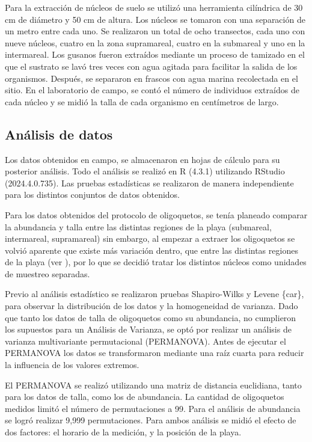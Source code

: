 \documentclass[
  authoryear,
  preprint,
  3p,
  twocolumn]{elsarticle}
\begin{document}
Para la extracción de núcleos de suelo se utilizó una herramienta
cilíndrica de 30 cm de diámetro y 50 cm de altura. Los núcleos se
tomaron con una separación de un metro entre cada uno. Se realizaron un
total de ocho transectos, cada uno con nueve núcleos, cuatro en la zona
supramareal, cuatro en la submareal y uno en la intermareal. Los gusanos
fueron extraídos mediante un proceso de tamizado en el que el sustrato
se lavó tres veces con agua agitada para facilitar la salida de los
organismos. Después, se separaron en frascos con agua marina recolectada
en el sitio. En el laboratorio de campo, se contó el número de
individuos extraídos de cada núcleo y se midió la talla de cada
organismo en centímetros de largo.

\subsection{\texorpdfstring{\textbf{Análisis de
datos}}{Análisis de datos}}\label{anuxe1lisis-de-datos}

Los datos obtenidos en campo, se almacenaron en hojas de cálculo para su
posterior análisis. Todo el análisis se realizó en R (4.3.1) utilizando
RStudio (2024.4.0.735). Las pruebas estadísticas se realizaron de manera
independiente para los distintos conjuntos de datos obtenidos.

Para los datos obtenidos del protocolo de oligoquetos, se tenía planeado
comparar la abundancia y talla entre las distintas regiones de la playa
(submareal, intermareal, supramareal) sin embargo, al empezar a extraer
los oligoquetos se volvió aparente que existe más variación dentro, que
entre las distintas regiones de la playa (ver \citet{fig1}), por lo que
se decidió tratar los distintos núcleos como unidades de muestreo
separadas.

Previo al análisis estadístico se realizaron pruebas Shapiro-Wilks y
Levene \{car\}, para observar la distribución de los datos y la
homogeneidad de varianza. Dado que tanto los datos de talla de
oligoquetos como su abundancia, no cumplieron los supuestos para un
Análisis de Varianza, se optó por realizar un análisis de varianza
multivariante permutacional (PERMANOVA). Antes de ejecutar el PERMANOVA
los datos se transformaron mediante una raíz cuarta para reducir la
influencia de los valores extremos.

El PERMANOVA se realizó utilizando una matriz de distancia euclidiana,
tanto para los datos de talla, como los de abundancia. La cantidad de
oligoquetos medidos limitó el número de permutaciones a 99. Para el
análisis de abundancia se logró realizar 9,999 permutaciones. Para ambos
análisis se midió el efecto de dos factores: el horario de la medición,
y la posición de la playa.
\end{document}
